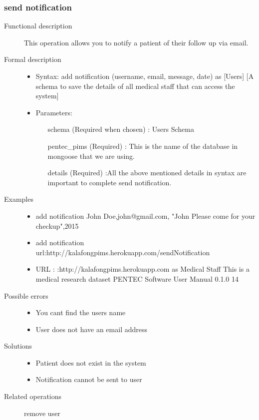 \documentclass[a4paper]{article}
\begin{document}
\subsubsection{send notification}
\begin{description}
\item[Functional description] This operation allows you to notify a patient of their follow up via email.
\item[Formal description]\hfill
\begin{itemize}
	\item Syntax: add notification (username, email, message, date) as [Users] [A schema to save the details of all medical staff that can access the system]\\
	\item Parameters:
	\begin{itemize}
		\item [schema] (Required when chosen) : Users Schema
		\item [pentec\_pims] (Required) : This is the name of the database in mongoose that we are using.
		\item [details] (Required) :All the above mentioned details in syntax are important to complete send notification.
	\end{itemize}
\end{itemize}
\item[Examples]\hfill
\begin{itemize}
	\item add notification John Doe,john@gmail.com, "John Please come for your checkup",2015
	\item add notification url:http://kalafongpims.herokuapp.com/sendNotification
	\item URL : :http://kalafongpims.herokuapp.com as Medical Staff This is a medical research dataset
	PENTEC Software User Manual 0.1.0 14
\end{itemize}

\item[Possible errors]\hfill
\begin{itemize}
	\item You cant find the users name
	\item User does not have an email address
\end{itemize}


\item[Solutions]\hfill
\begin{itemize}
	\item Patient does not exist in the system
	\item Notification cannot be sent to user
\end{itemize}


\item[Related operations] remove user
\end{description}
	   
\end{document}
